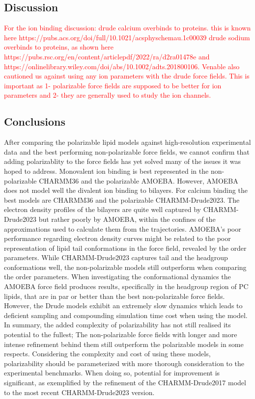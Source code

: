 \documentclass[journal=jacsat,manuscript=article,layout=singlecolumn]{achemso}
\begin{document}
\subsection{Discussion}

\textcolor{red}{For the ion binding discussion: drude calcium overbinds to proteins. this is known here https://pubs.acs.org/doi/full/10.1021/acsphyschemau.1c00039
drude sodium overbinds to proteins, as shown here https://pubs.rsc.org/en/content/articlepdf/2022/ra/d2ra01478e and https://onlinelibrary.wiley.com/doi/abs/10.1002/adts.201800106. Venable also cautioned us against using any ion parameters with the drude force fields. This is important as 1- polarizable force fields are supposed to be better for ion parameters and 2- they are generally used to study the ion channels.}

\subsection{Conclusions}
After comparing the polarizable lipid models against high-resolution experimental data and the best performing non-polarizable force fields, we cannot confirm that adding polarizablity to the force fields has yet solved many of the issues it was hoped to address. Monovalent ion binding is best represented in the non-polarizable CHARMM36 and the polarizable AMOEBA. However, AMOEBA does not model well the divalent ion binding to bilayers. For calcium binding the best models are CHARMM36 and the polarizable CHARMM-Drude2023.
 The electron density profiles of the bilayers are quite well captured by CHARMM-Drude2023 but rather poorly by AMOEBA, within the confines of the approximations used to calculate them from the trajectories. AMOEBA's poor performance regarding electron density curves might be related to the poor representation of lipid tail conformations in the force field, revealed by the order parameters. While CHARMM-Drude2023 captures tail and the headgroup conformations well, the non-polarizable models still outperform when comparing the order parameters. When investigating the conformational dynamics the AMOEBA force field produces results, specifically in the headgroup region of PC lipids, that are in par or better than the best non-polarizable force fields. However, the Drude models exhibit an extremely slow dynamics which leads to deficient sampling and compounding simulation time cost when using the model. In summary, the added complexity of polarizability has not still realised its potential to the fullest; The non-polarizable force fields with longer and more intense refinement behind them still outperform the polarizable models in some respects. Considering the complexity and cost of using these models, polarizability should be parameterized with more thorough consideration to the experimental benchmarks. When doing so, potential for improvement is significant, as exemplified by the refinement of the CHARMM-Drude2017 model to the most recent CHARMM-Drude2023 version.
\end{document}
